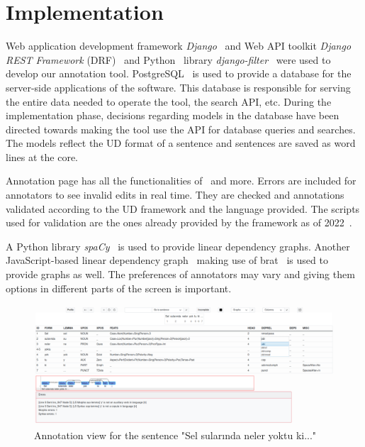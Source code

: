 \section{Implementation}
\label{sec:implementation}

Web application development framework \textit{Django}~\cite{django} and Web API toolkit \textit{Django REST Framework} (DRF)~\cite{drf} and Python~\cite{python} library \textit{django-filter}~\cite{django-filter} were used to develop our annotation tool.
PostgreSQL~\cite{psql} is used to provide a database for the server-side applications of the software.
This database is responsible for serving the entire data needed to operate the tool, the search API, etc.
During the implementation phase, decisions regarding models in the database have been directed towards making the tool use the API for database queries and searches.
The models reflect the UD format of a sentence and sentences are saved as word lines at the core.

Annotation page has all the functionalities of \boatvone\ and more.
Errors are included for annotators to see invalid edits in real time.
They are checked and annotations validated according to the UD framework and the language provided.
The scripts used for validation are the ones already provided by the framework as of 2022~\cite{UD-git}.

A Python library \textit{spaCy}~\cite{spacy} is used to provide linear dependency graphs.
Another JavaScript-based linear dependency graph~\cite{spyssalo} making use of brat~\cite{brat-vis} is used to provide graphs as well.
The preferences of annotators may vary and giving them options in different parts of the screen is important.

\begin{figure}[tbh]
    \centering
    \includegraphics[width=1\textwidth]{figures/1.png}
    \caption{Annotation view for the sentence "Sel sularında neler yoktu ki..."}
    \label{fig:demo-fig}
\end{figure}

